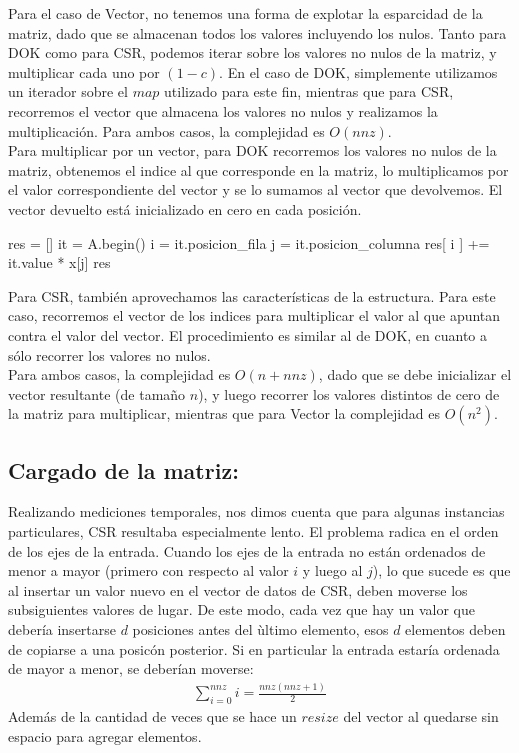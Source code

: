 Para el caso de Vector, no tenemos una forma de explotar la esparcidad de la matriz, dado que se almacenan todos los valores incluyendo los nulos. Tanto para DOK como para CSR, podemos iterar sobre los valores no nulos de la matriz, y multiplicar cada uno por $(1-c)$. En el caso de DOK, simplemente utilizamos un iterador sobre el $map$ utilizado para este fin, mientras que para CSR, recorremos el vector que almacena los valores no nulos y realizamos la multiplicación. Para ambos casos, la complejidad es $O(nnz)$. \\

Para multiplicar por un vector, para DOK recorremos los valores no nulos de la matriz, obtenemos el indice al que corresponde en la matriz, lo multiplicamos por el valor correspondiente del vector y se lo sumamos al vector que devolvemos. El vector devuelto está inicializado en cero en cada posición.


\begin{algorithmic}[1]
    \State res = []
    \State it = A.begin()
      \State i = it.posicion_fila
      \State j = it.posicion_columna
      \State res[ i ] += it.value * x[j]
    \EndWhile
    \Return res
  \EndFunction
\end{algorithmic}

Para CSR, también aprovechamos las características de la estructura. Para este caso, recorremos el vector de los indices para multiplicar el valor al que apuntan contra el valor del vector. El procedimiento es similar al de DOK, en cuanto a sólo recorrer los valores no nulos. \\

Para ambos casos, la complejidad es $O(n + nnz)$, dado que se debe inicializar el vector resultante (de tamaño $n$), y luego recorrer los valores distintos de cero de la matriz para multiplicar, mientras que para Vector la complejidad es $O(n^2)$.

\subsection{Cargado de la matriz:}
Realizando mediciones temporales, nos dimos cuenta que para algunas instancias particulares, CSR resultaba especialmente lento. El problema radica en el orden de los ejes de la entrada. Cuando los ejes de la entrada no están ordenados de menor a mayor (primero con respecto al valor $i$ y luego al $j$), lo que sucede es que al insertar un valor nuevo en el vector de datos de CSR, deben moverse los subsiguientes valores de lugar. De este modo, cada vez que hay un valor que debería insertarse $d$ posiciones antes del ùltimo elemento, esos $d$ elementos deben de copiarse a una posicón posterior. Si en particular la entrada estaría ordenada de mayor a menor, se deberían moverse:
\begin{eqnarray}
\sum_{i = 0}^{nnz} i = \frac{nnz(nnz+1)}{2}\label{eq:ecuResize}
\end{eqnarray}
Además de la cantidad de veces que se hace un $resize$ del vector al quedarse sin espacio para agregar elementos. \\

